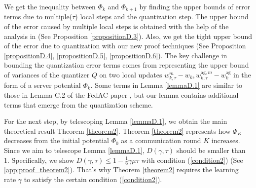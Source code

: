 \documentclass[11pt]{article}
\begin{document}
We get the inequality between $\Phi_k$ and $\Phi_{k+1}$ by finding the upper bounds of error terms due to multiple($\tau$) local steps and the quantization step. The upper bound of the error caused by multiple local steps is obtained with the help of the analysis in \cite{Yeojoon-yuan2020federated} (See Proposition \ref{propositionD.3}). Also, we get the tight upper bound of the error due to quantization with our new proof techniques (See Proposition \ref{propositionD.4}, \ref{propositionD.5}, \ref{propositionD.6}). The key challenge in bounding the quantization error terms comes from representing the upper bound of variances of the quantizer $Q$ on two local updates $w_{k, \tau}^m - w_k, w_{k, \tau}^{\textrm{ag}, m} - w_k^{\textrm{ag}}$ in the form of a server potential $\Phi_k$. Some terms in Lemma \ref{lemmaD.1} are similar to those in Lemma C.2 of the FedAC paper \cite{Yeojoon-yuan2020federated}, but our lemma contains additional terms that emerge from the quantization scheme.

For the next step, by telescoping Lemma \ref{lemmaD.1}, we obtain the main theoretical result Theorem \ref{theorem2}. Theorem \ref{theorem2} represents how $\Phi_K$ decreases from the initial potential $\Phi_0$ as a communication round $K$ increases. Since we aim to telescope Lemma \ref{lemmaD.1}, $D(\gamma, \tau)$ should be smaller than 1. Specifically, we show $D(\gamma, \tau) \leq 1-\frac{1}{6}\gamma\mu\tau$ with condition (\ref{condition2}) (See \cref{app:proof_theorem2}). That's why Theorem \ref{theorem2} requires the learning rate $\gamma$ to satisfy the certain condition (\ref{condition2}).

\end{document}
